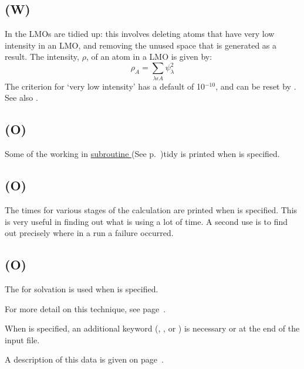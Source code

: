 \subsection*{ (W)}
In  the LMOs are tidied up:  this involves deleting atoms that have
very low intensity in an LMO, and removing the unused space that is generated
as a result.  The intensity, $\rho$,  of an atom in a LMO is given by:
\begin{equation}
\rho_A=\sum_{\lambda\epsilon A}\psi_{\lambda}^2
\end{equation}
The criterion for `very low intensity' has a default of
10$^{-10}$, and can be reset by .  See also .

\subsection*{ (O)} 
Some of the working in \hyperref[pageref]{subroutine }{ (See
p.~}{)}{tidy} is printed when  is specified.

\subsection*{ (O)}
The times for various stages of the calculation are printed when 
is specified.  This is very useful in finding out what is using a lot of
time.  A second use is to find out precisely where in a run a failure occurred.

\subsection*{ (O)}
The  for solvation is used when  is specified.

\begin{latexonly}
For more detail on this technique, see page~\pageref{mst}.
\end{latexonly}

When  is specified, an additional keyword (,
, or ) is necessary or  at the end of the input file.

\begin{latexonly}
A description of this data is given on page~\pageref{mstdata}.
\end{latexonly}

